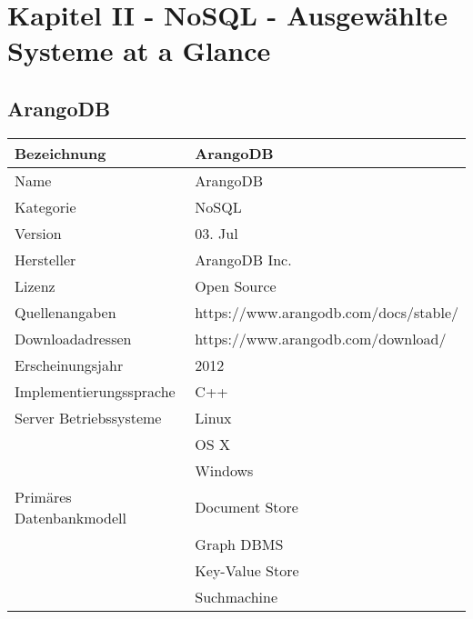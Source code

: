 \chapter{Kapitel II - NoSQL - Ausgewählte Systeme at a Glance}
\section{ArangoDB}
\begin{table}[h]
    \centering
    \begin{tabular}{|l|l|}
    \hline
\textbf{Bezeichnung}                    & \textbf{ArangoDB}                              \\ \hline
Name                             & ArangoDB                              \\ \hline
Kategorie                        & NoSQL                                 \\ \hline
Version                          & 03. Jul                               \\ \hline
Hersteller                       & ArangoDB Inc.                         \\ \hline
Lizenz                           & Open Source                           \\ \hline
Quellenangaben                   & https://www.arangodb.com/docs/stable/ \\ \hline
Downloadadressen                 & https://www.arangodb.com/download/    \\ \hline
Erscheinungsjahr                 & 2012                                  \\ \hline
Implementierungssprache          & C++                                   \\ \hline
Server Betriebssysteme           & Linux                                 \\
                                 & OS X                                  \\
                                 & Windows                               \\ \hline
Primäres Datenbankmodell         & Document Store                        \\
                                 & Graph DBMS                            \\
                                 & Key-Value Store                       \\
                                 & Suchmachine                           \\ \hline

\end{tabular}
\end{table}
